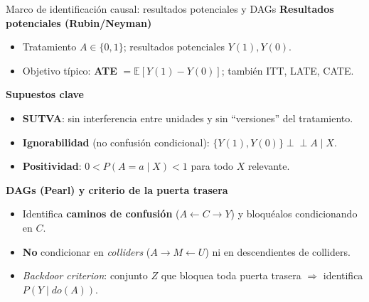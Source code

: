 ﻿\documentclass{beamer}
\begin{document}
\begin{frame}{Marco de identificación causal: resultados potenciales y DAGs}
\small
\textbf{Resultados potenciales (Rubin/Neyman)}
\begin{itemize}
  \item Tratamiento $A\in\{0,1\}$; resultados potenciales $Y(1),Y(0)$.
  \item Objetivo típico: \textbf{ATE} $=\mathbb{E}[Y(1)-Y(0)]$; también ITT, LATE, CATE.
\end{itemize}

\textbf{Supuestos clave}
\begin{itemize}
  \item \textbf{SUTVA}: sin interferencia entre unidades y sin “versiones” del tratamiento.
  \item \textbf{Ignorabilidad} (no confusión condicional): $\{Y(1),Y(0)\}\perp\!\!\!\perp A \mid X$.
  \item \textbf{Positividad}: $0<P(A=a\mid X)<1$ para todo $X$ relevante.
\end{itemize}

\textbf{DAGs (Pearl) y criterio de la puerta trasera}
\begin{itemize}
  \item Identifica \textbf{caminos de confusión} ($A \leftarrow C \rightarrow Y$) y bloquéalos condicionando en $C$.
  \item \textbf{No} condicionar en \textit{colliders} ($A \rightarrow M \leftarrow U$) ni en descendientes de colliders.
  \item \textit{Backdoor criterion}: conjunto $Z$ que bloquea toda puerta trasera $\Rightarrow$ identifica $P(Y\mid do(A))$.
\end{itemize}

\end{frame}
\end{document}
